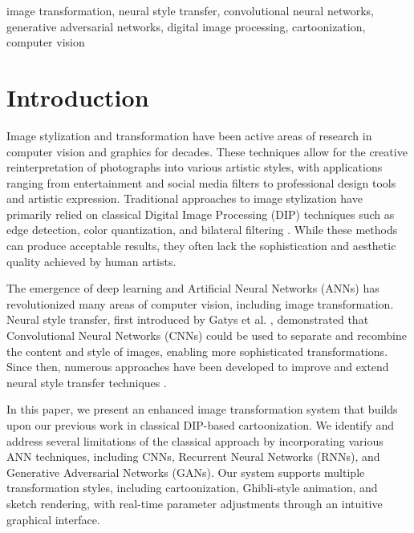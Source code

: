 \documentclass[conference]{IEEEtran}
\begin{document}
\begin{IEEEkeywords}
image transformation, neural style transfer, convolutional neural networks, generative adversarial networks, digital image processing, cartoonization, computer vision
\end{IEEEkeywords}

\section{Introduction}
Image stylization and transformation have been active areas of research in computer vision and graphics for decades. These techniques allow for the creative reinterpretation of photographs into various artistic styles, with applications ranging from entertainment and social media filters to professional design tools and artistic expression. Traditional approaches to image stylization have primarily relied on classical Digital Image Processing (DIP) techniques such as edge detection, color quantization, and bilateral filtering \cite{winnemöller2006real}. While these methods can produce acceptable results, they often lack the sophistication and aesthetic quality achieved by human artists.

The emergence of deep learning and Artificial Neural Networks (ANNs) has revolutionized many areas of computer vision, including image transformation. Neural style transfer, first introduced by Gatys et al. \cite{gatys2016image}, demonstrated that Convolutional Neural Networks (CNNs) could be used to separate and recombine the content and style of images, enabling more sophisticated transformations. Since then, numerous approaches have been developed to improve and extend neural style transfer techniques \cite{jing2019neural}.

In this paper, we present an enhanced image transformation system that builds upon our previous work in classical DIP-based cartoonization. We identify and address several limitations of the classical approach by incorporating various ANN techniques, including CNNs, Recurrent Neural Networks (RNNs), and Generative Adversarial Networks (GANs). Our system supports multiple transformation styles, including cartoonization, Ghibli-style animation, and sketch rendering, with real-time parameter adjustments through an intuitive graphical interface.
\end{document}
